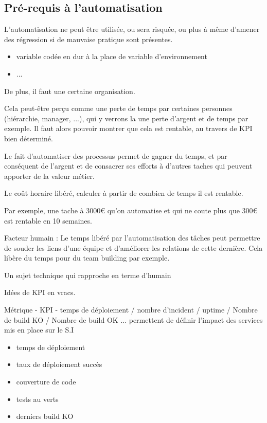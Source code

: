 \subsection{Pré-requis à l'automatisation}

L'automatisation ne peut être utilisée, ou sera risquée, ou plus à même d'amener des régression si de mauvaise pratique sont présentes.

\begin{itemize}
	\item variable codée en dur à la place de variable d'environnement
	\item ...
\end{itemize}

De plus, il faut une certaine organisation.

Cela peut-être perçu comme une perte de temps par certaines personnes (hiérarchie, manager, ...), qui y verrons la une perte d'argent et de temps par exemple. Il faut alors pouvoir montrer que cela est rentable, au travers de \gls{KPI} bien déterminé.

Le fait d'automatiser des processus permet de gagner du temps, et par conséquent de l'argent et de consacrer ses efforts à d'autres taches qui peuvent apporter de la valeur métier.

Le coût horaire libéré, calculer à partir de combien de temps il est rentable.

Par exemple, une tache à 3000€ qu'on automatise et qui ne coute plus que 300€ est rentable en 10 semaines.

Facteur humain : Le temps libéré par l'automatisation des tâches peut permettre de souder les liens d'une équipe et d'améliorer les relations de cette dernière. Cela libère du temps pour du team building par exemple.

Un sujet technique qui rapproche en terme d'humain

Idées de \gls{KPI} en vracs.

Métrique - KPI - temps de déploiement / nombre d'incident / uptime / Nombre de build KO / Nombre de build OK ... permettent de définir l'impact des services mis en place sur le S.I

\begin{itemize}
	\item temps de déploiement
	\item taux de déploiement succès
	\item couverture de code
	\item tests au verts
	\item derniers build KO
\end{itemize}

